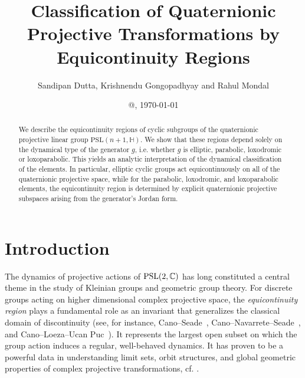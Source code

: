 \documentclass[12pt,reqno]{amsart}
\numberwithin{equation}{section}
\theoremstyle{definition}
\def\C{\mathbb C}
\def\C{\mathbb {C}}
\begin{document}
 
\title[Equicontinuity Regions]{Classification of Quaternionic Projective Transformations by Equicontinuity Regions}
	\author[S.  Dutta, K. Gongopadhyay and R. Mondal]{Sandipan Dutta, Krishnendu Gongopadhyay and 
		Rahul Mondal}
	
	\address{Mizoram University,
		Tanhril, Aizawl 796004, Mizoram, India}
	
	\address{Indian Institute of Science Education and Research (IISER) Mohali,
		Knowledge City,  Sector 81, S.A.S. Nagar 140306, Punjab, India}

	\address{Indian Institute of Science Education and Research (IISER) Mohali,
		Knowledge City,  Sector 81, S.A.S. Nagar 140306, Punjab, India}
	
	\date{ @\currenttime , \today}
\begin{abstract}
We describe the equicontinuity regions of cyclic subgroups of the quaternionic projective linear group $\mathrm{PSL}(n+1,\mathbb{H})$. We show that these regions depend solely on the dynamical type of the generator $g$, i.e. whether $g$ is elliptic, parabolic, loxodromic or loxoparabolic. This yields an analytic interpretation of the dynamical classification of the  elements. In particular, elliptic cyclic groups act equicontinuously on all of the quaternionic projective space, while for the parabolic, loxodromic, and loxoparabolic elements, the equicontinuity region is determined by explicit quaternionic projective subspaces arising from the generator's Jordan form.
\end{abstract}
    	\maketitle 

	\section{Introduction} 

The dynamics of projective actions of ${\rm PSL}(2, \C)$  has long constituted a central theme in the study of Kleinian groups and geometric group theory. For discrete groups acting on higher dimensional complex projective space, the \emph{equicontinuity region} plays a fundamental role as an invariant that generalizes the classical domain of discontinuity (see, for instance, Cano--Seade~\cite{can2}, Cano--Navarrete--Seade~\cite{cns}, and Cano--Loeza--Ucan Puc~\cite{cano_main}). It represents the largest open subset on which the group action induces a regular, well-behaved dynamics. It has proven to be a powerful data in understanding limit sets, orbit structures, and global geometric properties of complex projective transformations, cf. \cite{cns}. 
\end{document}
